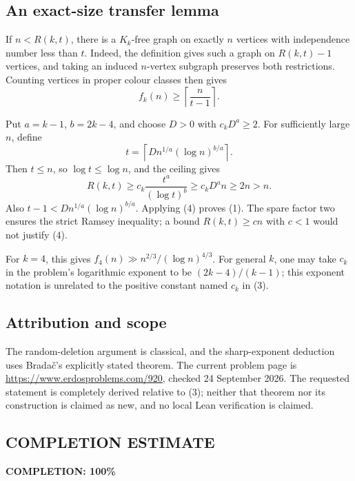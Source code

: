 \subsection*{An exact-size transfer lemma}
If \(n<R(k,t)\), there is a \(K_k\)-free graph on exactly \(n\) vertices with independence number less than \(t\). Indeed, the definition gives such a graph on \(R(k,t)-1\) vertices, and taking an induced \(n\)-vertex subgraph preserves both restrictions. Counting vertices in proper colour classes then gives
\[
f_k(n)\geq\left\lceil\frac{n}{t-1}\right\rceil. \tag{4}
\]

Put \(a=k-1\), \(b=2k-4\), and choose \(D>0\) with \(c_kD^a\geq2\). For sufficiently large \(n\), define
\[
t=\left\lceil D n^{1/a}(\log n)^{b/a}\right\rceil.
\]
Then \(t\leq n\), so \(\log t\leq\log n\), and the ceiling gives
\[
R(k,t)\geq c_k\frac{t^a}{(\log t)^b}
\geq c_kD^a n\geq2n>n.
\]
Also \(t-1<D n^{1/a}(\log n)^{b/a}\). Applying (4) proves (1).
The spare factor two ensures the strict Ramsey inequality; a bound \(R(k,t)\geq c n\) with \(c<1\) would not justify (4).

For \(k=4\), this gives \(f_4(n)\gg n^{2/3}/(\log n)^{4/3}\). For general \(k\), one may take \(c_k\) in the problem's logarithmic exponent to be \((2k-4)/(k-1)\); this exponent notation is unrelated to the positive constant named \(c_k\) in (3).

\subsection*{Attribution and scope}
The random-deletion argument is classical, and the sharp-exponent deduction uses Brada\v{c}'s explicitly stated theorem. The current problem page is \url{https://www.erdosproblems.com/920}, checked 24 September 2026. The requested statement is completely derived relative to (3); neither that theorem nor its construction is claimed as new, and no local Lean verification is claimed.
\subsection*{COMPLETION ESTIMATE}
\textbf{COMPLETION: 100\%}
